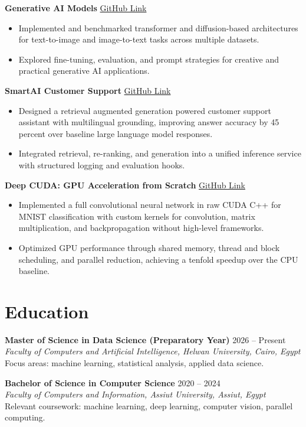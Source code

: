 \documentclass[10pt,letterpaper]{article}
\begin{document}
\textbf{Generative AI Models} \hfill \href{https://github.com/Islam-hady9/Generative-AI-Models}{GitHub Link}
\begin{itemize}
\item Implemented and benchmarked transformer and diffusion-based architectures for text-to-image and image-to-text tasks across multiple datasets.
\item Explored fine-tuning, evaluation, and prompt strategies for creative and practical generative AI applications.
\end{itemize}

\textbf{SmartAI Customer Support} \hfill \href{https://github.com/Islam-hady9/SmartAI_CustomerSupport}{GitHub Link}
\begin{itemize}
\item Designed a retrieval augmented generation powered customer support assistant with multilingual grounding, improving answer accuracy by 45 percent over baseline large language model responses.
\item Integrated retrieval, re-ranking, and generation into a unified inference service with structured logging and evaluation hooks.
\end{itemize}

\textbf{Deep CUDA: GPU Acceleration from Scratch} \hfill \href{https://github.com/Islam-hady9/deep-cuda}{GitHub Link}
\begin{itemize}
\item Implemented a full convolutional neural network in raw CUDA C++ for MNIST classification with custom kernels for convolution, matrix multiplication, and backpropagation without high-level frameworks.
\item Optimized GPU performance through shared memory, thread and block scheduling, and parallel reduction, achieving a tenfold speedup over the CPU baseline.
\end{itemize}

\section{Education}

\textbf{Master of Science in Data Science (Preparatory Year)} \hfill 2026 -- Present\\
\textit{Faculty of Computers and Artificial Intelligence, Helwan University, Cairo, Egypt}\\
Focus areas: machine learning, statistical analysis, applied data science.

\textbf{Bachelor of Science in Computer Science} \hfill 2020 -- 2024\\
\textit{Faculty of Computers and Information, Assiut University, Assiut, Egypt}\\
Relevant coursework: machine learning, deep learning, computer vision, parallel computing.
\end{document}
